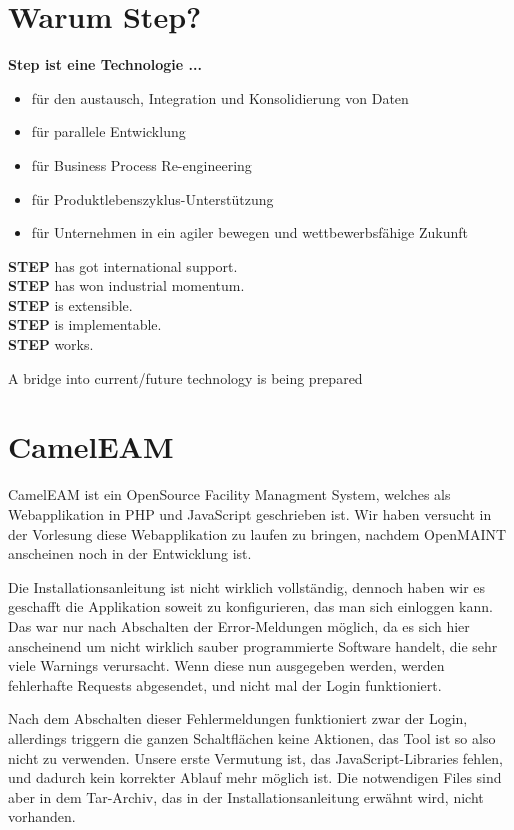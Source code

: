 \newpage\section{Warum Step?}

\textbf{Step ist eine Technologie ...}

\begin{itemize}
\item für den austausch, Integration und Konsolidierung von Daten
\item für parallele Entwicklung
\item für Business Process Re-engineering 
\item für Produktlebenszyklus-Unterstützung 
\item für Unternehmen in ein agiler bewegen und wettbewerbsfähige Zukunft
\end{itemize}

\textbf{STEP} has got international support. \\
\textbf{STEP} has won industrial momentum.  \\
\textbf{STEP} is extensible.  \\
\textbf{STEP} is implementable.  \\
\textbf{STEP} works.
 
A bridge into current/future technology is being prepared 

\section{CamelEAM}
CamelEAM ist ein OpenSource Facility Managment System, welches als Webapplikation in PHP und JavaScript geschrieben ist. Wir haben versucht in der Vorlesung diese Webapplikation zu laufen zu bringen, nachdem OpenMAINT anscheinen noch in der Entwicklung ist.

Die Installationsanleitung ist nicht wirklich vollständig, dennoch haben wir es geschafft die Applikation soweit zu konfigurieren, das man sich einloggen kann. Das war nur nach Abschalten der Error-Meldungen möglich, da es sich hier anscheinend um nicht wirklich sauber programmierte Software handelt, die sehr viele Warnings verursacht. Wenn diese nun ausgegeben werden, werden fehlerhafte Requests abgesendet, und nicht mal der Login funktioniert.

Nach dem Abschalten dieser Fehlermeldungen funktioniert zwar der Login, allerdings triggern die ganzen Schaltflächen keine Aktionen, das Tool ist so also nicht zu verwenden. Unsere erste Vermutung ist, das JavaScript-Libraries fehlen, und dadurch kein korrekter Ablauf mehr möglich ist. Die notwendigen Files sind aber in dem Tar-Archiv, das in der Installationsanleitung erwähnt wird, nicht vorhanden.

